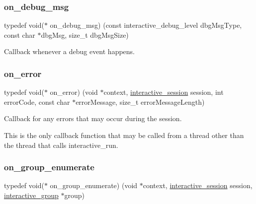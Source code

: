 \mbox{\label{group___interactivity_gac182f6e9e39863cd1671a69aa1ead684}} 
\subsubsection{\texorpdfstring{on\+\_\+debug\+\_\+msg}{on\_debug\_msg}}
{\footnotesize\ttfamily typedef void($\ast$ on\+\_\+debug\+\_\+msg) (const interactive\+\_\+debug\+\_\+level dbg\+Msg\+Type, const char $\ast$dbg\+Msg, size\+\_\+t dbg\+Msg\+Size)}



Callback whenever a debug event happens. 

\mbox{\label{group___interactivity_gabb1eefe2ce4247a4562fe1f231a35144}} 
\subsubsection{\texorpdfstring{on\+\_\+error}{on\_error}}
{\footnotesize\ttfamily typedef void($\ast$ on\+\_\+error) (void $\ast$context, \mbox{\hyperlink{group___interactivity_ga6d8819d38b8dc8994a2299cf22a65a31}{interactive\+\_\+session}} session, int error\+Code, const char $\ast$error\+Message, size\+\_\+t error\+Message\+Length)}



Callback for any errors that may occur during the session. 

This is the only callback function that may be called from a thread other than the thread that calls {\ttfamily interactive\+\_\+run}. \mbox{\label{group___interactivity_ga94f3f5e9c3f20ed45e333767263adbc2}} 
\subsubsection{\texorpdfstring{on\+\_\+group\+\_\+enumerate}{on\_group\_enumerate}}
{\footnotesize\ttfamily typedef void($\ast$ on\+\_\+group\+\_\+enumerate) (void $\ast$context, \mbox{\hyperlink{group___interactivity_ga6d8819d38b8dc8994a2299cf22a65a31}{interactive\+\_\+session}} session, \mbox{\hyperlink{structinteractive__group}{interactive\+\_\+group}} $\ast$group)}



